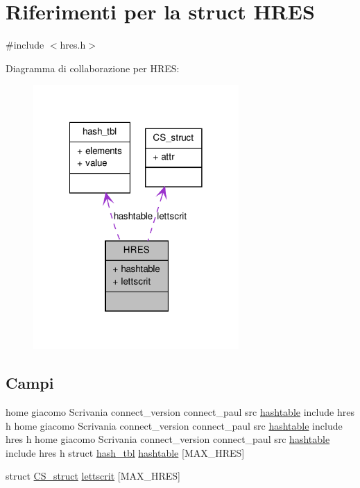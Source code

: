 \hypertarget{structHRES}{
\section{Riferimenti per la struct HRES}
\label{structHRES}
}


{\ttfamily \#include $<$hres.h$>$}



Diagramma di collaborazione per HRES:
\nopagebreak
\begin{figure}[H]
\begin{center}
\leavevmode
\includegraphics[width=222pt]{structHRES__coll__graph}
\end{center}
\end{figure}
\subsection*{Campi}
\begin{DoxyCompactItemize}
\item 
home giacomo Scrivania connect\_\-version connect\_\-paul src \hyperlink{structHRES_a75644267093228e40a1569db3d8dcb99}{hashtable} include hres h home giacomo Scrivania connect\_\-version connect\_\-paul src \hyperlink{structHRES_a75644267093228e40a1569db3d8dcb99}{hashtable} include hres h home giacomo Scrivania connect\_\-version connect\_\-paul src \hyperlink{structHRES_a75644267093228e40a1569db3d8dcb99}{hashtable} include hres h struct \hyperlink{structhash__tbl}{hash\_\-tbl} \hyperlink{structHRES_a75644267093228e40a1569db3d8dcb99}{hashtable} \mbox{[}MAX\_\-HRES\mbox{]}
\item 
struct \hyperlink{structCS__struct}{CS\_\-struct} \hyperlink{structHRES_a15be68e2c1a18bf0e889c3dc720d85b7}{lettscrit} \mbox{[}MAX\_\-HRES\mbox{]}
\end{DoxyCompactItemize}


